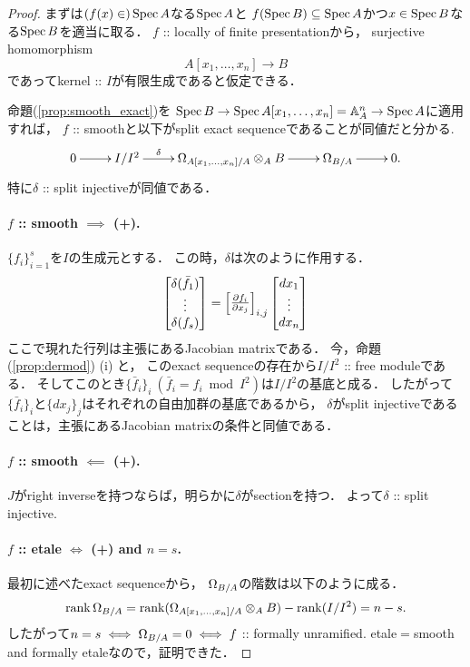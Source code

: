 \documentclass[a4paper]{jsarticle}
\begin{document}
\begin{proof}
    まずは$(f(x) \in) \operatorname{Spec} A$なる$\operatorname{Spec} A$と
    $f(\operatorname{Spec} B) \subseteq \operatorname{Spec} A$かつ$x \in \operatorname{Spec} B$なる$\operatorname{Spec} B$を適当に取る．
    $f$ :: locally of finite presentationから，
    surjective homomorphism
    \[ A[x_1, \dots, x_n] \to B \]
    であってkernel :: $I$が有限生成であると仮定できる．

    命題(\ref{prop:smooth_exact})を
    $\operatorname{Spec} B \to \operatorname{Spec} A[x_1,\dots,x_n]=\mathbb{A}^n_A \to \operatorname{Spec} A$に適用すれば，
    $f$ :: smoothと以下がsplit exact sequenceであることが同値だと分かる.
    \[\xymatrix{
        0 \ar[r]& I/I^2 \ar[r]^-{\delta}& \modDer_{A[x_1,\dots,x_n]/A} \otimes_A B \ar[r]& \modDer_{B/A} \ar[r]& 0.
    }\]
    特に$\delta$ :: split injectiveが同値である．

    \paragraph{$f$ :: smooth $\implies$ (+).}
    $\{ f_i \}_{i=1}^s$を$I$の生成元とする．
    この時，$\delta$は次のように作用する．
    \[ \begin{bmatrix}\delta(\bar{f}_1) \\ \vdots \\ \delta(f_s)\end{bmatrix}
    =\begin{bmatrix}\frac{\partial f_i}{\partial x_j}\end{bmatrix}_{i,j} \begin{bmatrix}dx_1 \\ \vdots \\ dx_n\end{bmatrix} \]
    ここで現れた行列は主張にあるJacobian matrixである．
    今，命題(\ref{prop:dermod}) (i) と，
    このexact sequenceの存在から$I/I^2$ :: free moduleである．
    そしてこのとき$\{ \bar{f}_i \}_i \ (\bar{f}_i=f_i \bmod I^2)$は$I/I^2$の基底と成る．
    したがって$\{\bar{f}_i\}_i$と$\{dx_j\}_j$はそれぞれの自由加群の基底であるから，
    $\delta$がsplit injectiveであることは，主張にあるJacobian matrixの条件と同値である．

    \paragraph{$f$ :: smooth $\impliedby$ (+).}
    $J$がright inverseを持つならば，明らかに$\delta$がsectionを持つ．
    よって$\delta$ :: split injective.
    
    \paragraph{$f$ :: etale $\iff$ (+) and $n=s$.}
    最初に述べたexact sequenceから，
    $\Omega_{B/A}$の階数は以下のように成る．
    \[
        \operatorname{rank} \Omega_{B/A}
        =\operatorname{rank} (\Omega_{A[x_1,\dots,x_n]/A} \otimes_A B)-\operatorname{rank} (I/I^2)
        =n-s.
    \]
    したがって$n=s \iff \Omega_{B/A}=0 \iff f$ :: formally unramified.
    etale$=$smooth and formally etaleなので，証明できた．
\end{proof}
\end{document}
